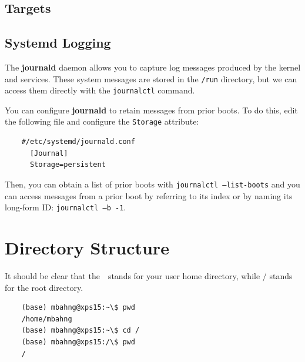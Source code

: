 \documentclass{article}
\begin{document}
  \subsection{Targets}

    
  \subsection{Systemd Logging}

    The \textbf{journald} daemon allows you to capture log messages produced by the kernel and services. These system messages are stored in the \texttt{/run} directory, but we can access them directly with the \texttt{journalctl}  command. 

    \begin{example}
      
    \end{example}

    You can configure \textbf{journald} to retain messages from prior boots. To do this, edit the following file and configure the \texttt{Storage} attribute: 
    \begin{lstlisting}
    #/etc/systemd/journald.conf
      [Journal]
      Storage=persistent
    \end{lstlisting}

    Then, you can obtain a list of prior boots with \texttt{journalctl --list-boots} and you can access messages from a prior boot by referring to its index or by naming its long-form ID: \texttt{journalctl --b -1}. 

\section{Directory Structure} 

    It should be clear that the $\texttt{~}$ stands for your user home directory, while $\texttt{/}$ stands for the root directory. 
    \begin{lstlisting}
    (base) mbahng@xps15:~\$ pwd
    /home/mbahng
    (base) mbahng@xps15:~\$ cd /
    (base) mbahng@xps15:/\$ pwd
    /
    \end{lstlisting}
\end{document}
